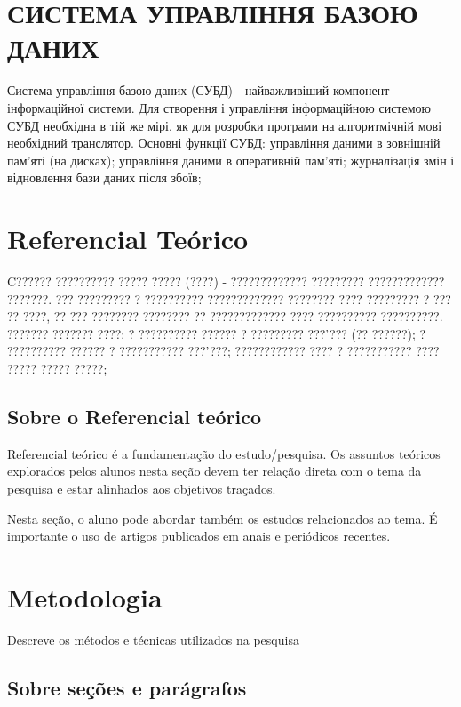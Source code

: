 \documentclass[12pt]{article}
\begin{document}
 

\section{\MakeUppercase{Система управління базою даних }}


Система управління базою даних (СУБД) - найважливіший компонент
інформаційної системи. Для створення і управління інформаційною
системою СУБД необхідна в тій же мірі, як для розробки програми на
алгоритмічній мові необхідний транслятор. Основні функції СУБД:
 управління даними в зовнішній пам'яті (на дисках);
 управління даними в оперативній пам'яті; журналізація змін і
відновлення бази даних після збоїв;

\section{Referencial Teórico} \label{sec:firstpage}

C?????? ?????????? ????? ????? (????) - ????????????? ?????????
????????????? ???????. ??? ????????? ? ?????????? ?????????????
???????? ???? ????????? ? ??? ?? ????, ?? ??? ???????? ???????? ??
????????????? ???? ?????????? ??????????. ??????? ??????? ????:
? ?????????? ?????? ? ????????? ???'??? (?? ??????);
? ?????????? ?????? ? ??????????? ???'???; ???????????? ???? ?
??????????? ???? ????? ????? ?????;

\subsection{Sobre o Referencial teórico}
Referencial teórico é a fundamentação do estudo/pesquisa. Os assuntos teóricos explorados pelos alunos nesta seção devem ter relação direta com o tema da pesquisa e estar alinhados aos objetivos traçados.

Nesta seção, o aluno pode abordar também os estudos relacionados ao tema. É importante o uso de artigos publicados em anais e periódicos recentes.


\section{Metodologia}

Descreve os métodos e técnicas utilizados na pesquisa

\subsection{Sobre seções e parágrafos}
\end{document}
